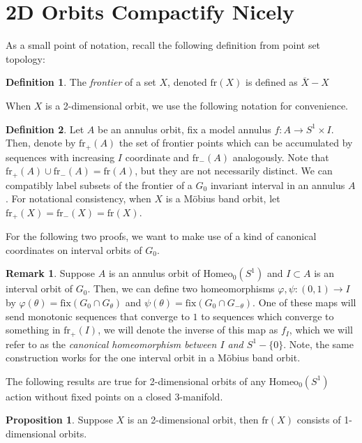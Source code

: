 \documentclass[10pt, oneside]{article}
\newcommand{\homeoS}{\text{Homeo}_0(S^1)}
\newcommand{\cl}[1]{\overline{#1}}
\theoremstyle{definition}
\newtheorem{defn}{Definition}[section]
\newtheorem{rem}{Remark}[section]
\newtheorem{prop}{Proposition}[section]
\theoremstyle{definition}
\begin{document}
\section{2D Orbits Compactify Nicely}
As a small point of notation, recall the following definition from point set topology:
\begin{defn}
    The {\it frontier} of a set $X$, denoted $\text{fr}(X)$ is defined as $\cl{X}-X$
\end{defn}

When $X$ is a 2-dimensional orbit, we use the following notation for convenience.

\begin{defn}
    Let $A$ be an annulus orbit, fix a model annulus $f:A\to S^1\times I$. Then, denote by $\text{fr}_+(A)$ the set of frontier points which can be accumulated by sequences with increasing $I$ coordinate and $\text{fr}_-(A)$ analogously. Note that $\text{fr}_+(A)\cup\text{fr}_-(A) = \text{fr}(A)$, but they are not necessarily distinct. We can compatibly label subsets of the frontier of a $G_0$ invariant interval in an annulus $A$. For notational consistency, when $X$ is a M\"{o}bius band orbit, let $\text{fr}_+(X) = \text{fr}_-(X) = \text{fr}(X)$.
\end{defn}

For the following two proofs, we want to make use of a kind of canonical coordinates on interval orbits of $G_0$.

\begin{rem}\cite{mann-chen}
    Suppose $A$ is an annulus orbit of $\homeoS$ and $I\subset A$ is an interval orbit of $G_0$. Then, we can define two homeomorphisms $\varphi, \psi:(0,1) \to I$ by $\varphi(\theta) = \text{fix}(G_0\cap G_\theta)$ and $\psi(\theta) = \text{fix}(G_0\cap G_{-\theta})$. One of these maps will send monotonic sequences that converge to $1$ to sequences which converge to something in $\text{fr}_+(I)$, we will denote the inverse of this map as $f_I$, which we will refer to as the {\it canonical homeomorphism between $I$ and $S^1 - \{0\}$}. Note, the same construction works for the one interval orbit in a M\"{o}bius band orbit.
\end{rem}

The following results are true for 2-dimensional orbits of any $\homeoS$ action without fixed points on a closed 3-manifold.

\begin{prop}
    Suppose $X$ is an 2-dimensional orbit, then $\text{fr}(X)$ consists of 1-dimensional orbits.
\end{prop}
\end{document}
